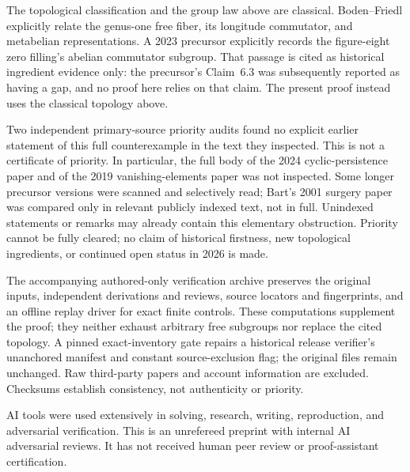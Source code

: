 \documentclass[11pt]{article}
\begin{document}
The topological classification and the group law above are classical.
Boden--Friedl \cite[Section~4.6, proof of Proposition~24, equation~(5)]{BF}
explicitly relate the genus-one free fiber, its longitude commutator, and
metabelian representations. A 2023 precursor \cite[p.~37]{IMT23} explicitly
records the figure-eight zero filling's abelian commutator subgroup.
That passage is cited as historical ingredient evidence only: the precursor's
Claim~6.3 was subsequently reported as having a gap, and no proof here relies
on that claim. The present proof instead uses the classical topology above.

Two independent primary-source priority audits found no explicit earlier
statement of this full counterexample in the text they inspected. This is
not a certificate of priority. In particular, the full body of the 2024
cyclic-persistence paper \cite{IMT24} and of the 2019 vanishing-elements paper
\cite{IMT19} was not inspected. Some longer precursor versions were scanned
and selectively read; Bart's 2001 surgery paper was compared only in relevant
publicly indexed text, not in full. Unindexed statements or remarks may
already contain this elementary obstruction. Priority cannot be fully cleared;
no claim of historical firstness, new topological ingredients, or continued
open status in 2026 is made.

The accompanying authored-only verification archive preserves the original
inputs, independent derivations and reviews, source locators and fingerprints,
and an offline replay driver for exact finite controls. These computations
supplement the proof; they neither exhaust arbitrary free subgroups nor replace
the cited topology. A pinned exact-inventory gate repairs a historical release
verifier's unanchored manifest and constant source-exclusion flag; the original
files remain unchanged. Raw third-party papers and account information are
excluded. Checksums establish consistency, not authenticity or priority.

AI tools were used extensively in solving, research, writing, reproduction,
and adversarial verification. This is an unrefereed preprint with internal AI
adversarial reviews. It has not received human peer review or proof-assistant
certification.
\end{document}
